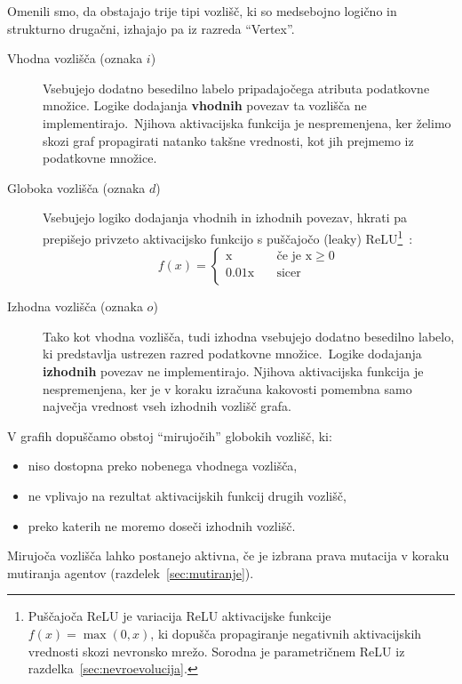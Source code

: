 \documentclass[a4paper,12pt,openright]{book}
\begin{document}
    Omenili smo, da obstajajo trije tipi vozlišč, ki so medsebojno logično in strukturno drugačni, izhajajo
    pa iz razreda \enquote{Vertex}.
    \begin{description}
        \item[Vhodna vozlišča (oznaka $i$)]{Vsebujejo dodatno besedilno labelo pripadajočega atributa podatkovne množice.
        Logike dodajanja \textbf{vhodnih} povezav ta vozlišča ne implementirajo.\ Njihova aktivacijska funkcija je nespremenjena, ker
        želimo skozi graf propagirati natanko takšne vrednosti, kot jih prejmemo iz podatkovne množice. }
        \item[Globoka vozlišča (oznaka $d$)]{Vsebujejo logiko dodajanja vhodnih in izhodnih povezav, hkrati pa prepišejo
        privzeto aktivacijsko funkcijo s puščajočo (leaky) ReLU\footnote{Puščajoča ReLU je variacija ReLU aktivacijske funkcije $f(x)=\max(0,x)$, ki dopušča propagiranje negativnih aktivacijskih
        vrednosti skozi nevronsko mrežo. Sorodna je parametričnem ReLU iz razdelka~\ref{sec:nevroevolucija}.}~\cite{maas2013rectifier}:
        \begin{equation}
            f(x)=
            \begin{cases}
                \text{x} & \quad\text{če je x}\ge0\\
                \text{0.01x} & \quad\text{sicer}\\
            \end{cases}
            \label{eq:leaky_relu}
        \end{equation}}
        \item[Izhodna vozlišča (oznaka $o$)]{Tako kot vhodna vozlišča, tudi izhodna vsebujejo dodatno besedilno labelo, ki predstavlja
        ustrezen razred podatkovne mno\-ži\-ce.\ Logike dodajanja \textbf{izhodnih} povezav ne implementirajo.
        Njihova aktivacijska funkcija je nespremenjena, ker je v koraku izračuna kakovosti pomembna samo največja
        vrednost vseh izhodnih vozlišč grafa. }
    \end{description}
    V grafih dopuščamo obstoj \enquote{mirujočih} globokih vozlišč, ki:
    \begin{itemize}
        \item niso dostopna preko nobenega vhodnega vozlišča,
        \item ne vplivajo na rezultat aktivacijskih funkcij drugih vozlišč,
        \item preko katerih ne moremo doseči izhodnih vozlišč.
    \end{itemize}
    Mirujoča vozlišča lahko postanejo aktivna, če je izbrana prava mutacija v koraku mutiranja agentov (razdelek~\ref{sec:mutiranje}).
\end{document}
